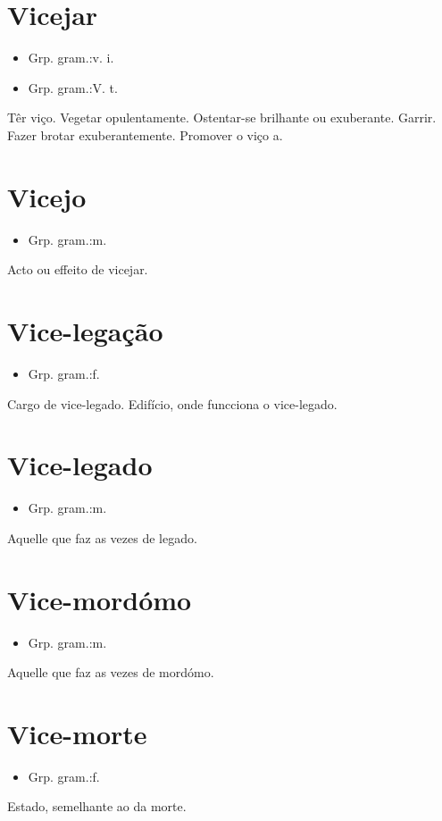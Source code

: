\documentclass{article}
\begin{document}
\section{Vicejar}
\begin{itemize}
\item {Grp. gram.:v. i.}
\end{itemize}
\begin{itemize}
\item {Grp. gram.:V. t.}
\end{itemize}
Têr viço.
Vegetar opulentamente.
Ostentar-se brilhante ou exuberante.
Garrir.
Fazer brotar exuberantemente.
Promover o viço a.
\section{Vicejo}
\begin{itemize}
\item {Grp. gram.:m.}
\end{itemize}
Acto ou effeito de vicejar.
\section{Vice-legação}
\begin{itemize}
\item {Grp. gram.:f.}
\end{itemize}
Cargo de vice-legado.
Edifício, onde funcciona o vice-legado.
\section{Vice-legado}
\begin{itemize}
\item {Grp. gram.:m.}
\end{itemize}
Aquelle que faz as vezes de legado.
\section{Vice-mordómo}
\begin{itemize}
\item {Grp. gram.:m.}
\end{itemize}
Aquelle que faz as vezes de mordómo.
\section{Vice-morte}
\begin{itemize}
\item {Grp. gram.:f.}
\end{itemize}
Estado, semelhante ao da morte.
\end{document}
